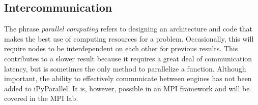 \subsection*{Intercommunication}
The phrase \emph{parallel computing} refers to designing an architecture and code that makes the best use of computing resources for a problem.
Occasionally, this will require nodes to be interdependent on each other for previous results.
This contributes to a slower result because it requires a great deal of communication latency, but is sometimes the only method to parallelize a function.
Although important, the ability to effectively communicate between engines has not been added to iPyParallel.
It is, however, possible in an MPI framework and will be covered in the MPI lab.

%
%
%
%
%
